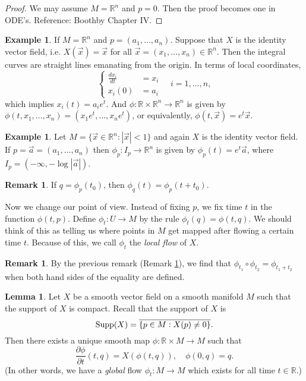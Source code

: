 \documentclass{amsart}
\numberwithin{equation}{section}
\newcommand{\bR}{\mathbb{R}}
\theoremstyle{definition}
\newtheorem{example}[definition]{Example}
\newtheorem{remark}[definition]{Remark}
\theoremstyle{theorem}
\newtheorem{lemma}[definition]{Lemma}
\begin{document}
\begin{proof}
We may assume $M = \mathbb{R}^n$ and $p = 0$. Then the proof becomes one in ODE's. Reference: Boothby Chapter IV. 
\end{proof}

\begin{example}
If $M = \mathbb{R}^n$ and $ p =(a_1, \ldots, a_n)$. Suppose that $X$ is the identity vector field,
i.e. $X(\vec{x})=\vec{x}$ for all $\vec{x}=(x_1,\ldots,x_n) \in \bR^n$.  
Then the integral curves are straight lines emanating from the origin. In terms of local coordinates, 
\[
\begin{cases}
\frac{d x_i}{dt} & = x_i \\
x_i(0) & = a_i
\end{cases}
\quad i=1,\ldots,n,
\]
which implies $x_i(t) = a_ie^t$. And $\phi : \bR \times \bR^n \to \bR^n$ 
is given by $\phi(t, x_1, \ldots, x_n) = (x_1 e^{t}, \ldots, x_n e^t)$, or equivalently,
$\phi(t,\vec{x})= e^t\vec{x}$.
\end{example}

\begin{example}
Let $M = \{\vec{x} \in \bR^n : |\vec{x}| < 1\}$ and again $X$ is the identity vector field. 
If $p=\vec{a}=(a_1,\ldots,a_n)$ then $\phi_p: I_p \to \bR^n$ is given by 
$\phi_p(t)= e^t \vec{a}$, where $I_p=(-\infty,-\log|\vec{a}|)$. 
\end{example}

\begin{remark}\label{tzero}
If $q = \phi_p(t_0)$, then $\phi_q(t) = \phi_p(t + t_0)$. 
\end{remark}

Now we change our point of view. Instead of fixing $p$, we fix time $t$ in the function $\phi(t,p)$. Define $\phi_t : U \to M$ by the rule $\phi_t(q) = \phi(t,q)$. We should think of this as telling us where points in $M$ get mapped after flowing a certain time $t$. Because of this, we call $\phi_t$ the {\em local flow} of $X$. 

\begin{remark}
By the previous remark (Remark \ref{tzero}), we find that $\phi_{t_1} \circ \phi_{t_2} = \phi_{t_1 + t_2}$ when both hand sides of the equality are
defined.  
\end{remark}

\begin{lemma}\label{flow-compact}
Let $X$ be a smooth vector field on a smooth manifold $M$ such that the support of $X$ is compact. Recall that the support of $X$ is 
\[
\textup{Supp}(X) = \overline{\{p \in M : X(p) \ne 0\}}.
\]
Then there exists a unique smooth map $\phi : \mathbb{R} \times M \to M$ such that 
\begin{equation}\label{phi-t-q}
\frac{\partial \phi}{\partial t}(t,q) = X(\phi(t,q)), \quad
\phi(0,q) = q.
\end{equation}
(In other words, we have a {\em global} flow $\phi_t: M\to M$ which exists for all time $t\in \bR$.)
\end{lemma}
\end{document}
